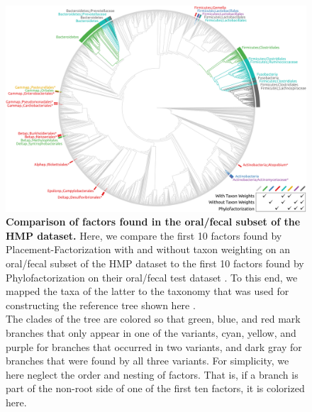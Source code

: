 \clearpage


\begin{figure}[!htb]
    \centering
     \includegraphics[width=\linewidth]{pdf/multi_factors_tree.pdf}
    \caption{
        \textbf{Comparison of factors found in the oral/fecal subset of the \ac{HMP} dataset.}
        Here, we compare the first \num{10} factors found by Placement-Factorization with and without taxon weighting
        on an oral/fecal subset of the \ac{HMP} dataset
        to the first \num{10} factors found by Phylofactorization on their oral/fecal test dataset \cite{Caporaso2011,Washburne2017a}.
        To this end, we mapped the taxa of the latter to the  taxonomy \cite{Quast2013,Yilmaz2014}
        that was used for constructing the reference tree shown here \cite{Czech2018}.
        \\
        The clades of the tree are colored so that green, blue, and red mark branches that only appear in one of the variants,
        cyan, yellow, and purple for branches that occurred in two variants,
        and dark gray for branches that were found by all three variants.
        For simplicity, we here neglect the order and nesting of factors.
        That is, if a branch is part of the non-root side of one of the first ten factors, it is colorized here.
}
\end{figure}
